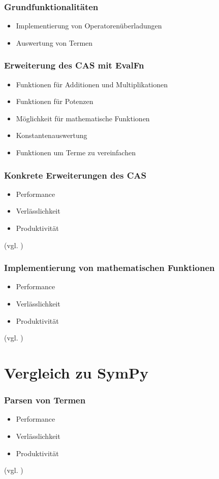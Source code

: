 \documentclass{beamer}
\begin{document}
\begin{frame}[fragile]
  \frametitle{Grundfunktionalitäten}
  \begin{itemize}
    \item Implementierung von Operatorenüberladungen
    \pause
    \item Auswertung von Termen
  \end{itemize}
\end{frame}

\begin{frame}[fragile]
  \frametitle{Erweiterung des CAS mit EvalFn}
  \begin{itemize}
    \item Funktionen für Additionen und Multiplikationen
    \pause
    \item Funktionen für Potenzen
    \pause
    \item Möglichkeit für mathematische Funktionen
    \pause
    \item Konstantenauswertung
    \pause
    \item Funktionen um Terme zu vereinfachen
  \end{itemize}
\end{frame}

\begin{frame}[fragile]
  \frametitle{Konkrete Erweiterungen des CAS}
  \begin{itemize}
    \item Performance
    \pause
    \item Verlässlichkeit
    \pause
    \item Produktivität
  \end{itemize}
  {\small (vgl. \cite{WhyRust})}
\end{frame}

\begin{frame}[fragile]
  \frametitle{Implementierung von mathematischen Funktionen}
  \begin{itemize}
    \item Performance
    \pause
    \item Verlässlichkeit
    \pause
    \item Produktivität
  \end{itemize}
  {\small (vgl. \cite{WhyRust})}
\end{frame}

\section{Vergleich zu SymPy}
\begin{frame}[fragile]
  \frametitle{Parsen von Termen}
  \begin{itemize}
    \item Performance
    \pause
    \item Verlässlichkeit
    \pause
    \item Produktivität
  \end{itemize}
  {\small (vgl. \cite{WhyRust})}
\end{frame}
\end{document}
